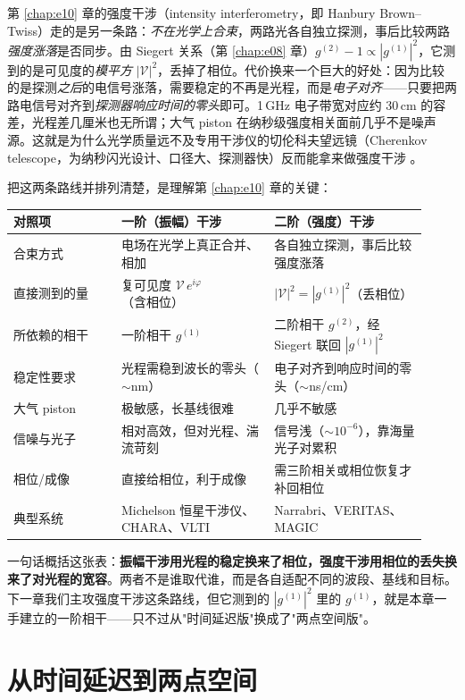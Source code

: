 第 \ref{chap:e10} 章的强度干涉（intensity interferometry，即 Hanbury Brown--Twiss）走的是另一条路：\emph{不在光学上合束}，两路光各自独立探测，事后比较两路\emph{强度涨落}是否同步。由 Siegert 关系（第 \ref{chap:e08} 章）\(g^{(2)}-1\propto|g^{(1)}|^2\)，它测到的是可见度的\emph{模平方} \(|\mathcal V|^2\)，丢掉了相位。代价换来一个巨大的好处：因为比较的是探测\emph{之后}的电信号涨落，需要稳定的不再是光程，而是\emph{电子对齐}——只要把两路电信号对齐到\emph{探测器响应时间的零头}即可。1\,GHz 电子带宽对应约 30\,cm 的容差，光程差几厘米也无所谓；大气 piston 在纳秒级强度相关面前几乎不是噪声源。这就是为什么光学质量远不及专用干涉仪的切伦科夫望远镜（Cherenkov telescope，为纳秒闪光设计、口径大、探测器快）反而能拿来做强度干涉 \citep{2020NatAs...4.1164A}。

把这两条路线并排列清楚，是理解第 \ref{chap:e10} 章的关键：

\begin{longtable}{p{0.24\linewidth}p{0.34\linewidth}p{0.34\linewidth}}
\toprule
对照项 & 一阶（振幅）干涉 & 二阶（强度）干涉 \\
\midrule
合束方式 & 电场在光学上真正合并、相加 & 各自独立探测，事后比较强度涨落 \\
直接测到的量 & 复可见度 \(\mathcal V\,e^{i\varphi}\)（含相位） & \(|\mathcal V|^2=|g^{(1)}|^2\)（丢相位） \\
所依赖的相干 & 一阶相干 \(g^{(1)}\) & 二阶相干 \(g^{(2)}\)，经 Siegert 联回 \(|g^{(1)}|^2\) \\
稳定性要求 & 光程需稳到波长的零头（\(\sim\)nm） & 电子对齐到响应时间的零头（\(\sim\)ns/cm） \\
大气 piston & 极敏感，长基线很难 & 几乎不敏感 \\
信噪与光子 & 相对高效，但对光程、湍流苛刻 & 信号浅（\(\sim10^{-6}\)），靠海量光子对累积 \\
相位/成像 & 直接给相位，利于成像 & 需三阶相关或相位恢复才补回相位 \\
典型系统 & Michelson 恒星干涉仪、CHARA、VLTI & Narrabri、VERITAS、MAGIC \\
\bottomrule
\end{longtable}

一句话概括这张表：\textbf{振幅干涉用光程的稳定换来了相位，强度干涉用相位的丢失换来了对光程的宽容}。两者不是谁取代谁，而是各自适配不同的波段、基线和目标。下一章我们主攻强度干涉这条路线，但它测到的 \(|g^{(1)}|^2\) 里的 \(g^{(1)}\)，就是本章一手建立的一阶相干——只不过从"时间延迟版"换成了"两点空间版"。

\section{从时间延迟到两点空间}
\label{sec:e09-spatial-gamma}


